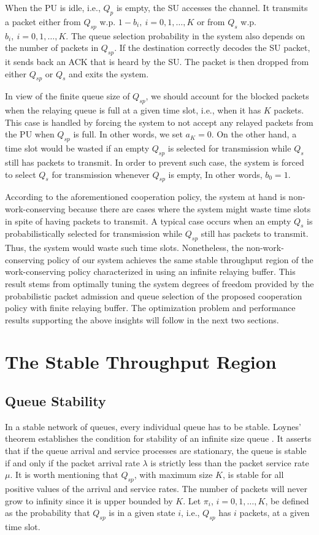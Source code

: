 \documentclass[conference]{IEEEtran}
\begin{document}
When the PU is idle, i.e., $Q_p$ is empty, the SU accesses the
channel. It transmits a packet either from $Q_{sp}$ w.p. $1-b_i,
\: i=0,1,\ldots,K$ or from $Q_s$ w.p. $b_i, \: i=0,1,\ldots,K$. The
queue selection probability in the system also depends on the
number of packets in $Q_{sp}$. If the destination correctly
decodes the SU packet, it sends back an ACK that is heard by the
SU. The packet is then dropped from either $Q_{sp}$ or $Q_s$ and
exits the system.

In view of the finite queue size of $Q_{sp}$, we should account
for the blocked packets when the relaying queue is full at a given
time slot, i.e., when it has $K$ packets. This case is handled by
forcing the system to not accept any relayed packets from the PU
when $Q_{sp}$ is full. In other words, we set $a_K=0$.
On the other hand, a time slot would be wasted if an empty
$Q_{sp}$ is selected for transmission while $Q_s$ still has
packets to transmit. In order to prevent such case, the system is
forced to select $Q_s$ for transmission whenever $Q_{sp}$ is
empty, In other words, $b_0=1$.

According to the aforementioned cooperation policy, the system 
at hand is non-work-conserving because there are cases
where the system might waste time slots in spite of having packets
to transmit. A typical case occurs when an empty $Q_s$ is
probabilistically selected for transmission while $Q_{sp}$ still
has packets to transmit. Thus, the system would waste such time
slots. Nonetheless, the non-work-conserving policy of our system
achieves the same stable throughput region of the work-conserving
policy characterized in \cite{R_CoopAcc} using an infinite relaying buffer. 
This result stems from optimally tuning the system degrees of freedom provided 
by the probabilistic packet admission and queue selection of 
the proposed cooperation policy with finite relaying buffer. 
The optimization problem and performance results supporting the 
above insights will follow in the next two sections.

\section{The Stable Throughput Region}
\subsection{Queue Stability}
In a stable network of queues, every individual queue has to be stable.
Loynes' theorem establishes the condition for stability of an
infinite size queue \cite{L_QStab}. It asserts that if the queue arrival and
service processes are stationary, the queue is stable if and only
if the packet arrival rate $\lambda$ is strictly less than the
packet service rate $\mu$. It is worth mentioning that
$Q_{sp}$, with maximum size $K$, is stable for all positive values of the arrival and
service rates. The number of packets will never grow to infinity
since it is upper bounded by $K$. Let $\pi_i$, $i=0,1,\ldots,K$, be
defined as the probability that $Q_{sp}$ is in a given state $i$,
i.e., $Q_{sp}$ has $i$ packets, at a given time slot.
\end{document}
